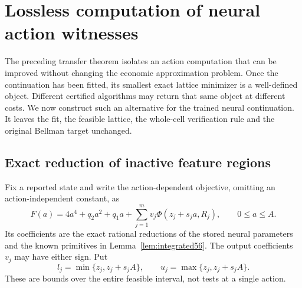 \section{Lossless computation of neural action witnesses}\label{sec:screen58}
The preceding transfer theorem isolates an action computation that can be improved without changing the economic approximation problem. Once the continuation has been fitted, its smallest exact lattice minimizer is a well-defined object. Different certified algorithms may return that same object at different costs. We now construct such an alternative for the trained neural continuation. It leaves the fit, the feasible lattice, the whole-cell verification rule and the original Bellman target unchanged.

\subsection{Exact reduction of inactive feature regions}
Fix a reported state and write the action-dependent objective, omitting an action-independent constant, as
\begin{equation}\label{eq:ridge-objective58}
 F(a)=4a^4+q_2a^2+q_1a+
       \sum_{j=1}^m v_j\Phi(z_j+s_ja,R_j),\qquad 0\le a\le A.
\end{equation}
Its coefficients are the exact rational reductions of the stored neural parameters and the known primitives in Lemma~\ref{lem:integrated56}. The output coefficients $v_j$ may have either sign. Put
\[
 l_j=\min\{z_j,z_j+s_jA\},\qquad
 u_j=\max\{z_j,z_j+s_jA\}.
\]
These are bounds over the entire feasible interval, not tests at a single action.

